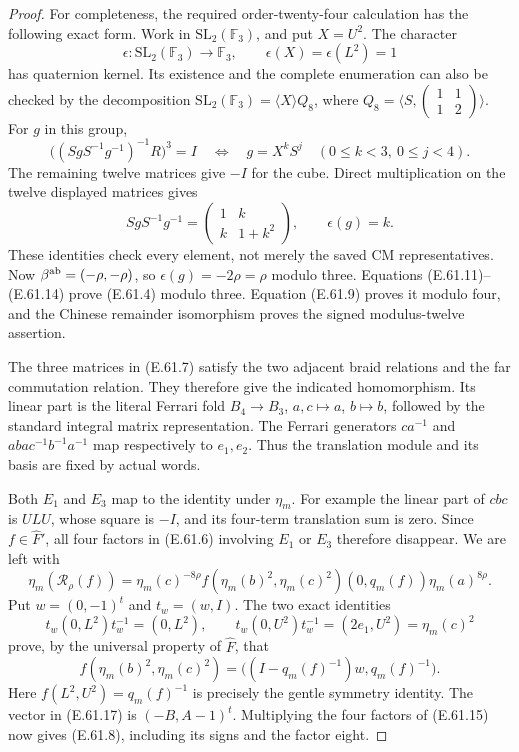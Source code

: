 \begin{proof}
For completeness, the required order-twenty-four calculation has
the following exact form.  Work in $\mathrm{SL}_2(\mathbb F_3)$,
and put $X=U^2$.  The character
\[
 \epsilon:\mathrm{SL}_2(\mathbb F_3)\longrightarrow\mathbb F_3,
 \qquad \epsilon(X)=\epsilon(L^2)=1
 \tag{E.61.12}
\]
has quaternion kernel.  Its existence and the complete enumeration
can also be checked by the decomposition
$\mathrm{SL}_2(\mathbb F_3)=\langle X\rangle Q_8$, where
$Q_8=\langle S,\left(\begin{smallmatrix}1&1\\1&2\end{smallmatrix}\right)\rangle$.
For $g$ in this group,
\[
 \bigl((SgS^{-1}g^{-1})^{-1}R\bigr)^3=I
 \quad\Longleftrightarrow\quad
 g=X^kS^j\quad(0\leq k<3,\ 0\leq j<4).
 \tag{E.61.13}
\]
The remaining twelve matrices give $-I$ for the cube.  Direct
multiplication on the twelve displayed matrices gives
\[
 SgS^{-1}g^{-1}
       =\begin{pmatrix}1&k\\ k&1+k^2\end{pmatrix},
       \qquad \epsilon(g)=k.
 \tag{E.61.14}
\]
These identities check every element, not merely the saved CM
representatives.  Now $\beta^{\rm ab}=(-\rho,-\rho)$, so
$\epsilon(g)=-2\rho=\rho$ modulo three.  Equations
(E.61.11)--(E.61.14) prove (E.61.4) modulo three.  Equation
(E.61.9) proves it modulo four, and the Chinese remainder
isomorphism proves the signed modulus-twelve assertion.

The three matrices in (E.61.7) satisfy the two adjacent braid
relations and the far commutation relation.  They therefore give
the indicated homomorphism.  Its linear part is the literal
Ferrari fold $B_4\to B_3$, $a,c\mapsto a$, $b\mapsto b$, followed
by the standard integral matrix representation.  The Ferrari
generators $ca^{-1}$ and
$aba c^{-1}b^{-1}a^{-1}$ map respectively to $e_1,e_2$.
Thus the translation module and its basis are fixed by actual
words.

Both $E_1$ and $E_3$ map to the identity under $\eta_m$.
For example the linear part of $cbc$ is $ULU$, whose square is
$-I$, and its four-term translation sum is zero.  Since
$f\in\widehat F'$, all four factors in (E.61.6) involving $E_1$
or $E_3$ therefore disappear.  We are left with
\[
 \eta_m(\mathcal R_\rho(f))
    =\eta_m(c)^{-8\rho}
       f(\eta_m(b)^2,\eta_m(c)^2)
       (0,q_m(f))\eta_m(a)^{8\rho}.
 \tag{E.61.15}
\]
Put $w=(0,-1)^t$ and $t_w=(w,I)$.  The two exact identities
\[
 t_w(0,L^2)t_w^{-1}=(0,L^2),\qquad
 t_w(0,U^2)t_w^{-1}=(2e_1,U^2)=\eta_m(c)^2
 \tag{E.61.16}
\]
prove, by the universal property of $\widehat F$, that
\[
 f(\eta_m(b)^2,\eta_m(c)^2)
       =\bigl((I-q_m(f)^{-1})w,q_m(f)^{-1}\bigr).
 \tag{E.61.17}
\]
Here $f(L^2,U^2)=q_m(f)^{-1}$ is precisely the gentle symmetry
identity.  The vector in (E.61.17) is $(-B,A-1)^t$.
Multiplying the four factors of (E.61.15) now gives
(E.61.8), including its signs and the factor eight.


\end{proof}
